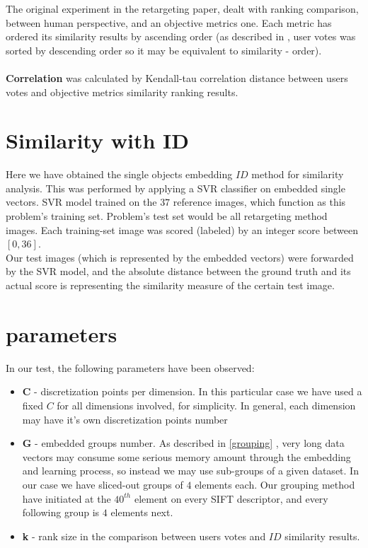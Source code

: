 The original experiment in the retargeting paper, dealt with ranking comparison, between human perspective, and an objective metrics one. Each metric has ordered its similarity results by ascending order (as described in  \cite{gfdfvdfs}, user votes was sorted by descending order so it may be equivalent to similarity - order).
\\ \\
\textbf{Correlation} was calculated by Kendall-tau correlation distance between users votes and objective metrics similarity ranking results.
\section{Similarity with ID}
Here we have obtained the single objects embedding $ID$ method for similarity analysis. This was performed by applying a SVR \cite{SVR} classifier on embedded single vectors.
SVR model trained on the $37$ reference images, which function as this problem's training set. Problem's test set would be all retargeting method images. Each training-set image was scored (labeled) by an integer score between $[0,36]$. \\

Our test images (which is represented by the embedded vectors) were forwarded by the SVR model, and the absolute distance between the ground truth and its actual score is representing the similarity measure of the certain test image.

\section{parameters}

In our test, the following parameters have been observed:
\begin{itemize}
	\item \textbf{C} - discretization points per dimension. In this particular case we have used a fixed $C$ for all dimensions involved, for simplicity. In general, each dimension may have it's own discretization points number
	\item \textbf{G} - embedded groups number. As described in \ref{grouping} , very long data vectors may consume some serious memory amount through the embedding and learning process, so instead we may use sub-groups of a given dataset. In our case we have sliced-out groups of $4$ elements each. Our grouping method have initiated at the $40^{th}$ element on every SIFT descriptor, and every following group is $4$ elements next.
	\item \textbf{k} - rank size in the comparison between users votes and $ID$ similarity results.
\end{itemize}

